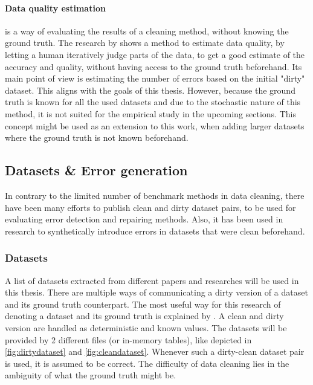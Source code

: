 \paragraph{Data quality estimation} is a way of evaluating the results of a cleaning method, without knowing the ground truth. The research by \cite{Chung2017-cl} shows a method to estimate data quality, by letting a human iteratively judge parts of the data, to get a good estimate of the accuracy and quality, without having access to the ground truth beforehand. Its main point of view is estimating the number of errors based on the initial "dirty" dataset. This aligns with the goals of this thesis. However, because the ground truth is known for all the used datasets and due to the stochastic nature of this method, it is not suited for the empirical study in the upcoming sections. This concept might be used as an extension to this work, when adding larger datasets where the ground truth is not known beforehand.


\subsection{Datasets \& Error generation}
In contrary to the limited number of benchmark methods in data cleaning, there have been many efforts to publish clean and dirty dataset pairs, to be used for evaluating error detection and repairing methods. Also, it has been used in research to synthetically introduce errors in datasets that were clean beforehand.

\subsubsection{Datasets}
A list of datasets extracted from different papers and researches will be used in this thesis. There are multiple ways of communicating a dirty version of a dataset and its ground truth counterpart. The most useful way for this research of denoting a dataset and its ground truth is explained by \cite{Mahdavi2019-zf}. A clean and dirty version are handled as deterministic and known values. The datasets will be provided by 2 different files (or in-memory tables), like depicted in \autoref{fig:dirtydataset} and \autoref{fig:cleandataset}. Whenever such a dirty-clean dataset pair is used, it is assumed to be correct. The difficulty of data cleaning lies in the ambiguity of what the ground truth might be. 

